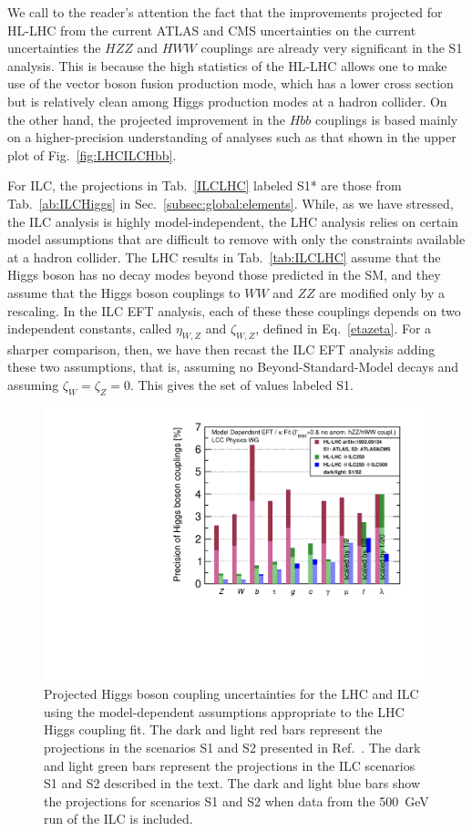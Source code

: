 We call to the reader's attention the fact that the improvements
projected for HL-LHC from the current ATLAS and CMS uncertainties on 
the current uncertainties
the $HZZ$ and $HWW$ couplings are already very
significant in the S1 analysis.  This is because the high statistics
of the HL-LHC allows one to make use of the vector boson fusion 
production mode, which has a lower cross section but is relatively
clean among Higgs production modes at a hadron collider.
   On the other hand, the projected improvement in the $Hbb$
couplings is based mainly on a higher-precision understanding of
analyses such as that shown in the upper plot of
Fig.~\ref{fig:LHCILCHbb}.

For ILC, the projections in Tab.~\ref{ILCLHC} labeled S1* are those
from  Tab.~\ref{ab:ILCHiggs}  in Sec.~\ref{subsec:global:elements}.
While, as we have stressed, the ILC analysis is highly
model-independent, the LHC analysis relies on certain model 
assumptions that are difficult to
remove with only the constraints available at a hadron collider.   The
LHC results in Tab.~\ref{tab:ILCLHC} assume  that the Higgs boson has no decay
modes beyond those predicted in the SM, and they  assume that the Higgs
boson couplings to $WW$ and $ZZ$ are modified only by a rescaling.  In
the ILC EFT analysis, each of these these couplings depends on two
independent constants, called $\eta_{W,Z}$ and $\zeta_{W,Z}$, defined
in Eq.~\ref{etazeta}.   For a sharper comparison, then, we have then recast the ILC EFT analysis
adding these two assumptions, that is, assuming no
Beyond-Standard-Model decays and assuming $\zeta_{W} = \zeta_Z = 0$.
This gives the set of values labeled S1.  


\begin{figure}
\begin{center}
\includegraphics[width=0.7\hsize]{chapters/figures/DeltaHXX_SM_ILC_LHC_MD_S12.pdf}
\caption{Projected Higgs boson coupling uncertainties for the LHC and
  ILC
using the model-dependent assumptions appropriate to the LHC Higgs
coupling fit.   The
dark and light red bars represent the projections in the scenarios S1
and S2 presented in Ref.~\cite{Cepeda:2019klc}.    The dark and light green bars represent the
projections in the ILC scenarios S1 and S2 described in the
text.  The dark and light blue bars show the projections for scenarios S1 and S2
when
data from the 500~GeV run of the ILC is included.}
 \label{fig:ILCLHC}
\end{center}
\end{figure}




